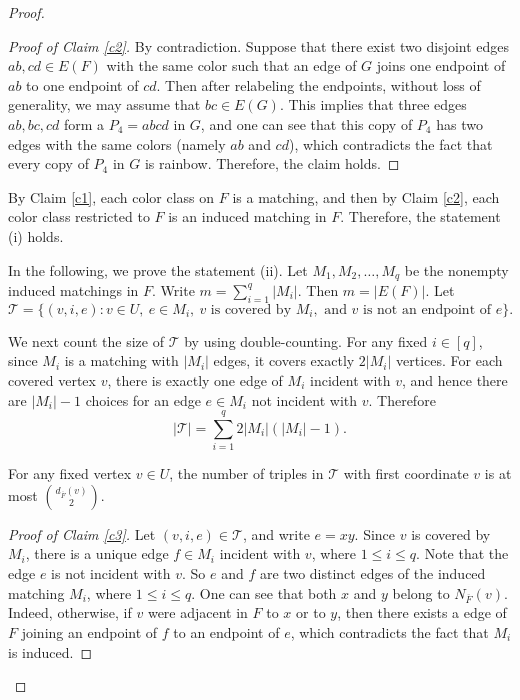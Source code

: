 \documentclass[10pt,a4paper]{amsart}
\begin{document}
\begin{proof}
\begin{proof}[Proof of Claim \ref{c2}]

By contradiction. Suppose that there exist two disjoint edges $ab,cd\in E(F)$  with the same color such that  
 an edge of $G$ joins one endpoint of $ab$ to one endpoint of $cd$.
Then after relabeling the endpoints, without loss of generality, we may assume that $bc\in E(G)$.  
This implies that three edges $ab,bc,cd$  form a $P_4=abcd$ in $G$, and one can see that this copy of $P_4$ has two  edges with the same colors (namely $ab$ and $cd$), which  contradicts the fact that every copy of $P_4$ in $G$ is rainbow.  Therefore, the claim holds.
\end{proof}


By Claim \ref{c1},  each color class on $F$ is a matching, and then by Claim \ref{c2}, each color class
restricted to $F$ is  an induced matching in $F$. Therefore, the statement (i) holds.



In the following, we prove the statement (ii).
Let $M_1,M_2,\ldots,M_q$ be the nonempty induced matchings in $F$.
Write $ m=\sum_{i=1}^q |M_i|$. Then $m=|E(F)|$.
Let 
\[
\mathcal T=\{(v,i,e): v\in U,\ e\in M_i,\ v\text{ is covered by }M_i,
\text{ and }v\text{ is not an endpoint of }e\}.
\] 

We next count  the size of $\mathcal T$ by using double-counting.
For any fixed $i\in [q]$, since $M_i$ is a matching with $|M_i|$ edges, it covers exactly $2|M_i|$
vertices.  For each covered vertex $v$, there is exactly one edge of $M_i$
incident with $v$, and hence there are $|M_i|-1$ choices for an edge
$e\in M_i$ not incident with $v$.  Therefore
\begin{equation}\label{eq:T-lower}
|\mathcal T|=\sum_{i=1}^q 2|M_i|(|M_i|-1).
\end{equation}

\begin{claim}\label{c3}
For any fixed  vertex $v\in U$,  the number of triples in
$\mathcal T$ with first coordinate $v$ is at most $\binom{d_{\overline {F}}(v)}{2}$.  
\end{claim}

\begin{proof}[Proof of Claim \ref{c3}]
Let $(v,i,e)\in\mathcal T$, and write $e=xy$.  
Since $v$ is covered by $M_i$, there is a unique edge $f\in M_i$ incident with $v$, where $1\le i\le q$.  
Note that the edge $e$ is not incident with $v$. 
So $e$ and $f$ are two distinct edges of the induced matching $M_i$, where $1\le i\le q$.  
One can see that both $x$ and $y$ belong to $N_{\overline F}(v)$.
Indeed, otherwise, if $v$ were adjacent in $F$ to $x$ or to $y$, then there exists a edge of $F$  joining an
endpoint of $f$ to an endpoint of $e$, which contradicts the fact that $M_i$ is induced.


\end{proof}
\end{proof}
\end{document}
